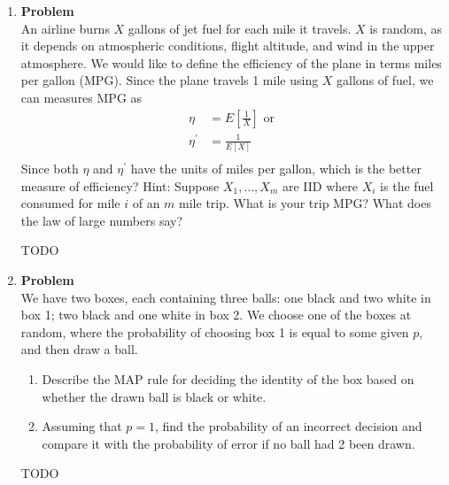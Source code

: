 \documentclass[12pt]{article}
\newenvironment{Ex}{\textbf{Problem}\vspace{.75em}\\}{}
\begin{document}
\begin{enumerate}
\item
  \begin{Ex}
    An airline burns $X$ gallons of jet fuel for each mile it travels. $X$
    is random, as it depends on atmospheric conditions, flight
    altitude, and wind in the upper atmosphere. We would like to
    define the efficiency of the plane in terms miles per gallon
    (MPG). Since the plane travels 1 mile using $X$ gallons of fuel, we
    can measures MPG as
    \begin{equation}
      \label{eq:6-mpg}
      \begin{aligned}
        \eta &= E\left[\frac{1}{X}\right] \text{ or } \\
        \eta^\prime &= \frac{1}{E[X]} \\
      \end{aligned}
    \end{equation}
    Since both $\eta$ and $\eta^\prime$ have the units of miles per gallon,
    which is the better measure of efficiency? Hint: Suppose
    $X_1,\ldots,X_m$ are IID where $X_i$ is the fuel consumed for mile
    $i$ of an $m$ mile trip. What is your trip MPG? What does the law
    of large numbers say?
    \begin{solution} \hfill
      {\color{red} \huge TODO}
    \end{solution}
  \end{Ex}

\item
  \begin{Ex}
    We have two boxes, each containing three balls: one black and two
    white in box 1; two black and one white in box 2. We choose one of
    the boxes at random, where the probability of choosing box 1 is
    equal to some given $p$, and then draw a ball.
    \begin{enumerate}
    \item Describe the MAP rule for deciding the identity of the box
      based on whether the drawn ball is black or white.
    \item Assuming that $p = 1$, find the probability of an incorrect
      decision and compare it with the probability of error if no ball
      had 2 been drawn.
    \end{enumerate}
    \begin{solution} \hfill
      {\color{red} \huge TODO}
    \end{solution}
  \end{Ex}

\end{enumerate}
\end{document}
